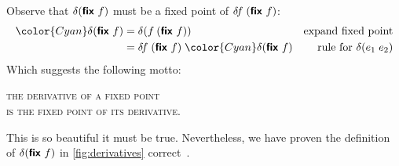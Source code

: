 \documentclass[sigplan,screen,review,timestamp,dvipsnames]{acmart}
\newcommand{\hilited}{\color{Cyan}}
\renewcommand{\d}{\delta}
\newcommand{\kw}[1]{\textsf{\bfseries#1}}
\newcommand{\efix}{\kw{fix}~}
\begin{document}
Observe that $\d(\efix f)$ must be a fixed point of $\d\!f\;(\efix f)$:
%
\begin{align*}
  {\hilited \d(\efix f)}
  &= \d(f\: (\efix f))
  & \text{expand fixed point}\\
  &= \d\!f\; (\efix f)\; {\hilited \d(\efix f)}
  & \text{rule for}~\delta(e_1\;e_2)
\end{align*}
%
Which suggests the following motto:
\begin{center}
  \large \scshape
  the derivative of a fixed point\\
  is the fixed point of its derivative.
\end{center}
%
This is so beautiful it must be true. Nevertheless, we have proven the definition of $\delta(\efix f)$ in \cref{fig:derivatives} correct~\citep{fixderiv}.







\end{document}
